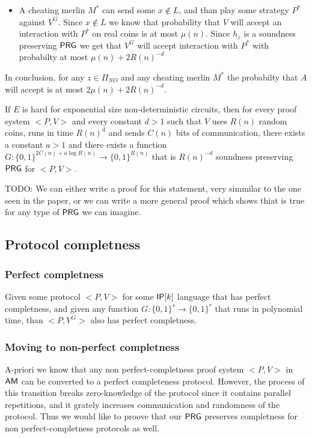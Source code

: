 \documentclass[11]{article}
\newenvironment{proof}[1][Proof]{\begin{trivlist}
\item[\hskip \labelsep {\bfseries #1}]}{\end{trivlist}}
\begin{document}
\begin{proof}
\begin{itemize}
	\item A cheating merlin $M^*$ can send some $x \notin L$, and than play some strategy $P^*$ against $V^G$. Since $x \notin L$ we know that probability that $V$ will accept an interaction with $P^*$ on real coins is at most $\mu(n)$. Since $h_z$ is a soundness preserving $\mathsf{PRG}$ we get that $V^G$ will accept interaction with $P^*$ with probabilty at most $\mu(n) + 2R(n)^{-d}$
\end{itemize}

In conclusion, for any $z \in \Pi_{NO}$ and any cheating merlin $M^*$ the probabilty that $A$ will accept is at most $2\mu(n) + 2R(n)^{-d}$.

\begin{theorem}
\label{soundness-perserving-PRG-Proof}

If $E$ is hard for exponential size non-deterministic circuits, then for every proof system $<P,V>$ and every constant $d > 1$ such that $V$ uses $R(n)$ random coins, runs in time $R(n)^d$ and sends $C(n)$ bits of communication, there exists a constant $a > 1$ and there exists a function $G: \{0,1\}^{2C(n) + a\log{R(n)}} \to \{0,1\}^{R(n)}$ that is $R(n)^{-d}$ soundness preserving $\mathsf{PRG}$ for $<P,V>$.

\end{theorem}

\begin{proof}
TODO: We can either write a proof for this statement, very simmilar to the one seen in the paper, or we can write a more general proof which shows thiat is true for any type of $\mathsf{PRG}$ we can imagine.
\end{proof}

\subsection{Protocol completness}
\subsubsection{Perfect completness}

\begin{corollary}
Given some protocol $<P,V>$ for some $\mathsf{IP}[k]$ language that has perfect completness, and given any function $G: \{0,1\}^s \to \{0,1\}^r$ that runs in polynomial time, than $<P, V^G>$ also has perfect completness.
\end{corollary}



\subsubsection{Moving to non-perfect completness}
A-priori we know that any non perfect-completness proof system $<P,V>$ in $\mathsf{AM}$ can be converted to a perfect completeness protocol. \cite{FGMSZ89} However, the process of this transition breaks zero-knowledge of the protocol since it contains parallel repetitions, and it grately increases communication and randomness of the protocol. Thus we would like to proove that our $\mathsf{PRG}$ preserves completness for non perfect-completness protocols as well.


\end{proof}
\end{document}
